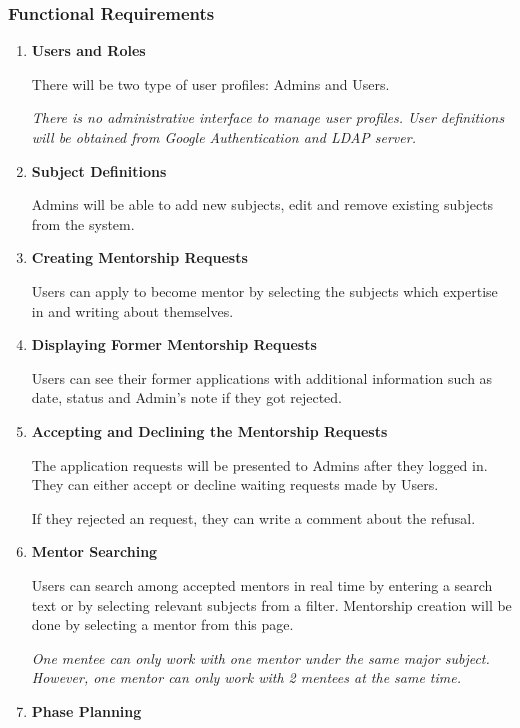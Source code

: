 \documentclass[10pt]{article}
\begin{document}
\subsubsection{Functional Requirements} \label{functional_requirements}
\begin{enumerate}

\item \textbf{Users and Roles}

There will be two type of user profiles: Admins and Users. 

\textit{There is no administrative interface to manage user profiles. User definitions
will be obtained from Google Authentication and LDAP server.}


\item \textbf{Subject Definitions}

Admins will be able to add new subjects, edit and remove existing subjects from the system.


\item \textbf{Creating Mentorship Requests}

Users can apply to become mentor by selecting the subjects which expertise in and writing
about themselves.


\item \textbf{Displaying Former Mentorship Requests}

Users can see their former applications with additional information such as date, status and 
Admin’s note if they got rejected.


\item \textbf{Accepting and Declining the Mentorship Requests}

The application requests will be presented to Admins after they logged in. They can either
accept or decline waiting requests made by Users.

If they rejected an request, they can write a comment about the refusal.


\item \textbf{Mentor Searching}

Users can search among accepted mentors in real time by entering a search text or by selecting
relevant subjects from a filter. Mentorship creation will be done by selecting a mentor from
this page.

\textit{One mentee can only work with one mentor under the same major subject. However, 
one mentor can only work with 2 mentees at the same time.}


\item \textbf{Phase Planning}


\end{enumerate}
\end{document}

